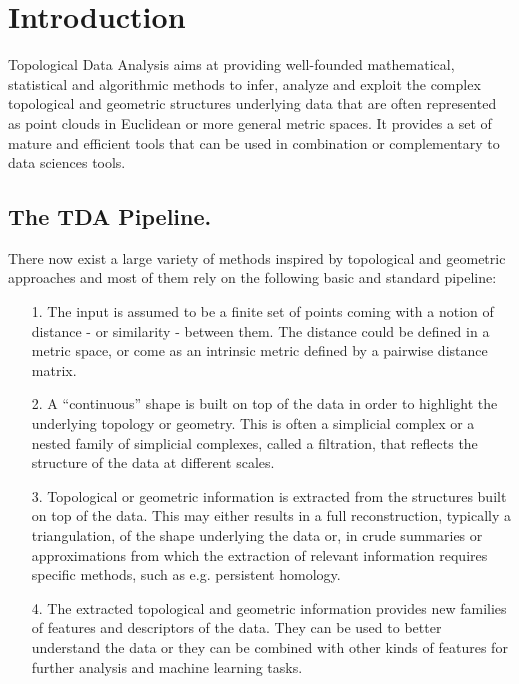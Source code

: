 \section{Introduction}
Topological Data Analysis aims at providing well-founded mathematical, statistical and algorithmic methods to infer, analyze and exploit the complex topological and geometric structures underlying data that are often represented as point clouds in Euclidean or more general metric spaces. It provides a set of mature and efficient tools that can be used in combination or complementary to data sciences tools.
\subsection{The TDA Pipeline.}
There now exist a large variety of methods inspired by topological and geometric approaches and most of them rely on the following basic and standard pipeline:
\begin{enumerate}
    \item[1.]The input is assumed to be a finite set of points coming with a notion of distance - or similarity - between them. The distance could be defined in a metric space, or  come as an intrinsic metric defined by a pairwise distance matrix.
    \item[2.]A “continuous” shape is built on top of the data in order to highlight the underlying topology or geometry. This is often a simplicial complex or a nested family of simplicial complexes, called a filtration, that reflects the structure of the data at different scales.
    \item[3.]Topological or geometric information is extracted from the structures built on top of the data.  This may either results in a full reconstruction, typically a triangulation, of the shape underlying the data or, in crude summaries or approximations from which the extraction of relevant information requires specific methods, such as e.g. persistent homology.
    \item[4.]The extracted topological and geometric information provides new families of features and descriptors of the data. They can be used to better understand the data or they can be combined with other kinds of features for further analysis and machine learning tasks. 
\end{enumerate}
